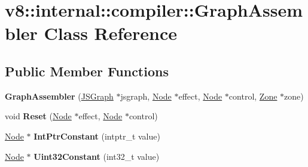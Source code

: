 \hypertarget{classv8_1_1internal_1_1compiler_1_1GraphAssembler}{}\section{v8\+:\+:internal\+:\+:compiler\+:\+:Graph\+Assembler Class Reference}
\label{classv8_1_1internal_1_1compiler_1_1GraphAssembler}
\subsection*{Public Member Functions}
\begin{DoxyCompactItemize}
\item 
\mbox{\label{classv8_1_1internal_1_1compiler_1_1GraphAssembler_a15237e2b0799b22b8d3e7e8973d711f4}} 
{\bfseries Graph\+Assembler} (\mbox{\hyperlink{classv8_1_1internal_1_1compiler_1_1JSGraph}{J\+S\+Graph}} $\ast$jsgraph, \mbox{\hyperlink{classv8_1_1internal_1_1compiler_1_1Node}{Node}} $\ast$effect, \mbox{\hyperlink{classv8_1_1internal_1_1compiler_1_1Node}{Node}} $\ast$control, \mbox{\hyperlink{classv8_1_1internal_1_1Zone}{Zone}} $\ast$zone)
\item 
\mbox{\label{classv8_1_1internal_1_1compiler_1_1GraphAssembler_ad158766c6da8c9f64f0fec2e7fc85d9b}} 
void {\bfseries Reset} (\mbox{\hyperlink{classv8_1_1internal_1_1compiler_1_1Node}{Node}} $\ast$effect, \mbox{\hyperlink{classv8_1_1internal_1_1compiler_1_1Node}{Node}} $\ast$control)
\item 
\mbox{\label{classv8_1_1internal_1_1compiler_1_1GraphAssembler_a2e707940a4c5e5ef20e9171c019d07a2}} 
\mbox{\hyperlink{classv8_1_1internal_1_1compiler_1_1Node}{Node}} $\ast$ {\bfseries Int\+Ptr\+Constant} (intptr\+\_\+t value)
\item 
\mbox{\label{classv8_1_1internal_1_1compiler_1_1GraphAssembler_a9f0add443de5a0143c34b87957ee2c0f}} 
\mbox{\hyperlink{classv8_1_1internal_1_1compiler_1_1Node}{Node}} $\ast$ {\bfseries Uint32\+Constant} (int32\+\_\+t value)
\item 
\mbox{\label{classv8_1_1internal_1_1compiler_1_1GraphAssembler_aedd2faf9158809eb8f54efec3e18ce26}} 

\end{DoxyCompactItemize}
